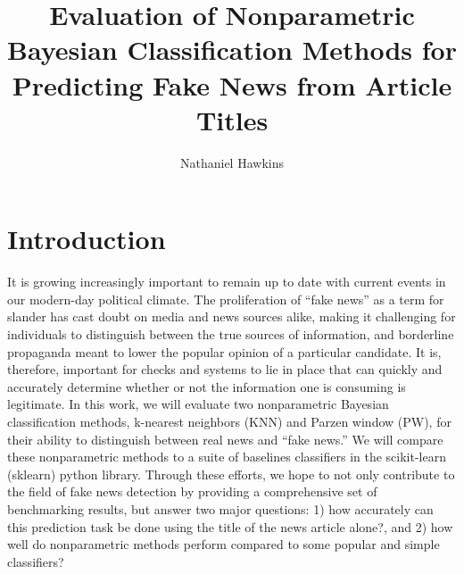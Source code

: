 \documentclass[12pt]{article}
\title{Evaluation of Nonparametric Bayesian Classification Methods for Predicting Fake News from Article Titles}
\author{Nathaniel Hawkins}
\date{}
\begin{document}
	\maketitle
	
	\section{Introduction}
	
    It is growing increasingly important to remain up to date with current events in our modern-day political climate. The proliferation of ``fake news'' as a term for slander has cast doubt on media and news sources alike, making it challenging for individuals to distinguish between the true sources of information, and borderline propaganda meant to lower the popular opinion of a particular candidate. It is, therefore, important for checks and systems to lie in place that can quickly and accurately determine whether or not the information one is consuming is legitimate. In this work, we will evaluate two nonparametric Bayesian classification methods, k-nearest neighbors (KNN) and Parzen window (PW), for their ability to distinguish between real news and ``fake news.'' We will compare these nonparametric methods to a suite of baselines classifiers in the scikit-learn (sklearn) python library. Through these efforts, we hope to not only contribute to the field of fake news detection by providing a comprehensive set of benchmarking results, but answer two major questions: 1) how accurately can this prediction task be done using the title of the news article alone?, and 2) how well do nonparametric methods perform compared to some popular and simple classifiers?
    
\end{document}
